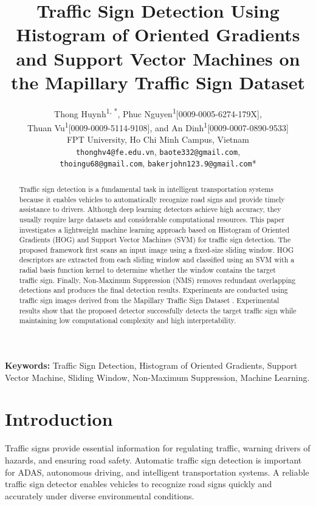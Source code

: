 \documentclass[11pt,a4paper,twoside]{article}
\title{\textbf{Traffic Sign Detection Using Histogram of Oriented Gradients and Support Vector Machines on the Mapillary Traffic Sign Dataset}}
\author{%
\begin{tabular}{c}
Thong Huynh\textsuperscript{1, *}, Phuc Nguyen\textsuperscript{1}[0009-0005-6274-179X],\\
Thuan Vu\textsuperscript{1}[0009-0009-5114-9108], and An Dinh\textsuperscript{1}[0009-0007-0890-9533]\\[0.45em]
FPT University, Ho Chi Minh Campus, Vietnam\\[0.25em]
\small\texttt{thonghv4@fe.edu.vn}, \texttt{baote332@gmail.com},\\
\small\texttt{thoingu68@gmail.com}, \texttt{bakerjohn123.9@gmail.com}*
\end{tabular}
}
\date{}
\begin{document}
\maketitle
\thispagestyle{empty}
\begin{abstract}

Traffic sign detection is a fundamental task in intelligent transportation systems because it enables vehicles to automatically recognize road signs and provide timely assistance to drivers. Although deep learning detectors achieve high accuracy, they usually require large datasets and considerable computational resources. This paper investigates a lightweight machine learning approach based on Histogram of Oriented Gradients (HOG) and Support Vector Machines (SVM) for traffic sign detection. The proposed framework first scans an input image using a fixed-size sliding window. HOG descriptors are extracted from each sliding window and classified using an SVM with a radial basis function kernel to determine whether the window contains the target traffic sign. Finally, Non-Maximum Suppression (NMS) removes redundant overlapping detections and produces the final detection results. Experiments are conducted using traffic sign images derived from the Mapillary Traffic Sign Dataset \cite{ertler2020mapillary}. Experimental results show that the proposed detector successfully detects the target traffic sign while maintaining low computational complexity and high interpretability.

\end{abstract}

\noindent\textbf{Keywords:} Traffic Sign Detection, Histogram of Oriented Gradients, Support Vector Machine, Sliding Window, Non-Maximum Suppression, Machine Learning.

\section{Introduction}

Traffic signs provide essential information for regulating traffic, warning drivers of hazards, and ensuring road safety. Automatic traffic sign detection is important for ADAS, autonomous driving, and intelligent transportation systems. A reliable traffic sign detector enables vehicles to recognize road signs quickly and accurately under diverse environmental conditions.
\end{document}
